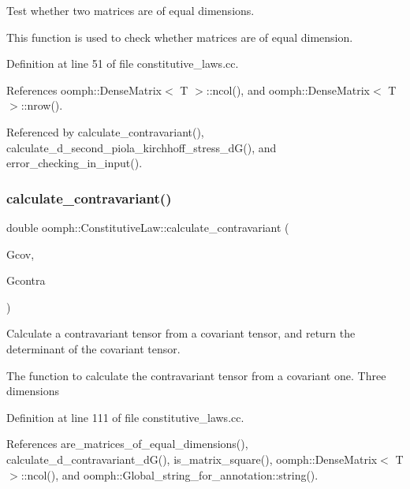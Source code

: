 Test whether two matrices are of equal dimensions. 

This function is used to check whether matrices are of equal dimension. 

Definition at line 51 of file constitutive\+\_\+laws.\+cc.



References oomph\+::\+Dense\+Matrix$<$ T $>$\+::ncol(), and oomph\+::\+Dense\+Matrix$<$ T $>$\+::nrow().



Referenced by calculate\+\_\+contravariant(), calculate\+\_\+d\+\_\+second\+\_\+piola\+\_\+kirchhoff\+\_\+stress\+\_\+d\+G(), and error\+\_\+checking\+\_\+in\+\_\+input().

\mbox{\label{classoomph_1_1ConstitutiveLaw_a5c188df10b08b340b923c3a733c0d178}} 
\subsubsection{\texorpdfstring{calculate\+\_\+contravariant()}{calculate\_contravariant()}}
{\footnotesize\ttfamily double oomph\+::\+Constitutive\+Law\+::calculate\+\_\+contravariant (\begin{DoxyParamCaption}\item[{const \hyperlink{classoomph_1_1DenseMatrix}{Dense\+Matrix}$<$ double $>$ \&}]{Gcov,  }\item[{\hyperlink{classoomph_1_1DenseMatrix}{Dense\+Matrix}$<$ double $>$ \&}]{Gcontra }\end{DoxyParamCaption})\hspace{0.3cm}{\ttfamily [protected]}}



Calculate a contravariant tensor from a covariant tensor, and return the determinant of the covariant tensor. 

The function to calculate the contravariant tensor from a covariant one. Three dimensions 

Definition at line 111 of file constitutive\+\_\+laws.\+cc.



References are\+\_\+matrices\+\_\+of\+\_\+equal\+\_\+dimensions(), calculate\+\_\+d\+\_\+contravariant\+\_\+d\+G(), is\+\_\+matrix\+\_\+square(), oomph\+::\+Dense\+Matrix$<$ T $>$\+::ncol(), and oomph\+::\+Global\+\_\+string\+\_\+for\+\_\+annotation\+::string().



